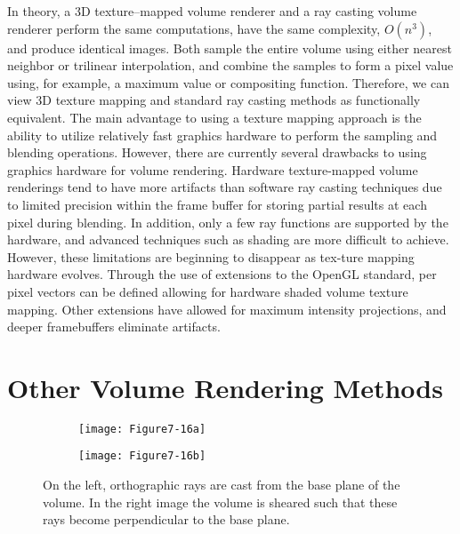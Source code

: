 In theory, a 3D texture--mapped volume renderer and a ray casting volume renderer perform the same computations, have the same complexity, $O(n^3)$, and produce identical images. Both sample the entire volume using either nearest neighbor or trilinear interpolation, and combine the samples to form a pixel value using, for example, a maximum value or compositing function. Therefore, we can view 3D texture mapping and standard ray casting methods as functionally equivalent. The main advantage to using a texture mapping approach is the ability to utilize relatively fast graphics hardware to perform the sampling and blending operations. However, there are currently several drawbacks to using graphics hardware for volume rendering. Hardware texture-mapped volume renderings tend to have more artifacts than software ray casting techniques due to limited precision within the frame buffer for storing partial results at each pixel during blending. In addition, only a few ray functions are supported by the hardware, and advanced techniques such as shading are more difficult to achieve. However, these limitations are beginning to disappear as tex-ture mapping hardware evolves. Through the use of extensions to the OpenGL standard, per pixel vectors can be defined allowing for hardware shaded volume texture mapping. Other extensions have allowed for maximum intensity projections, and deeper framebuffers eliminate artifacts.

\section{Other Volume Rendering Methods}

\begin{figure}[!htb]
	\begin{subfigure}[h]{0.48\linewidth}
		\texttt{[image: Figure7-16a]}
		\caption*{}\label{fig:Figure7-16a}
	\end{subfigure}
	\hfill
	\begin{subfigure}[h]{0.48\linewidth}
		\texttt{[image: Figure7-16b]}
		\caption*{}\label{fig:Figure7-16b}
	\end{subfigure}%
	\caption{On the left, orthographic rays are cast from the base plane of the volume. In the right image the volume is sheared such that these rays become perpendicular to the base plane.}\label{fig:Figure7-16}
\end{figure}

